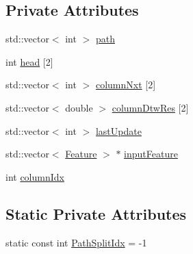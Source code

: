 \subsection*{Private Attributes}
\begin{DoxyCompactItemize}
\item 
std\+::vector$<$ int $>$ \hyperlink{class_wave_feature_o_p_a7e91a4de4afa4703c7e2e77e2ad6b73d}{path}
\item 
int \hyperlink{class_wave_feature_o_p_ad46053ff42554d848423b0caabeea87f}{head} \mbox{[}2\mbox{]}
\item 
std\+::vector$<$ int $>$ \hyperlink{class_wave_feature_o_p_ad14d7d2758bef1c990adda645f1a1d34}{column\+Nxt} \mbox{[}2\mbox{]}
\item 
std\+::vector$<$ double $>$ \hyperlink{class_wave_feature_o_p_a8341cc94705d4f96a53e61b397e26641}{column\+Dtw\+Res} \mbox{[}2\mbox{]}
\item 
std\+::vector$<$ int $>$ \hyperlink{class_wave_feature_o_p_abb3904a95a48013acf81a589a73983c0}{last\+Update}
\item 
std\+::vector$<$ \hyperlink{class_feature}{Feature} $>$ $\ast$ \hyperlink{class_wave_feature_o_p_a2e67fe9dc06889453b70fe6efa19554f}{input\+Feature}
\item 
int \hyperlink{class_wave_feature_o_p_a506bd025079326383412704dd93c402d}{column\+Idx}
\end{DoxyCompactItemize}
\subsection*{Static Private Attributes}
\begin{DoxyCompactItemize}
\item 
static const int \hyperlink{class_wave_feature_o_p_ad4482e96f3bca81925861baa598d01ed}{Path\+Split\+Idx} = -\/1
\end{DoxyCompactItemize}


